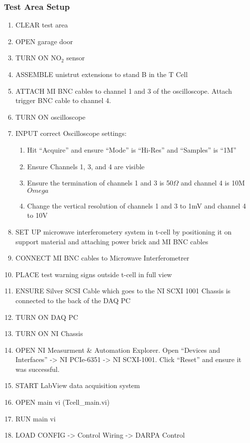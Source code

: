 \subsubsection*{Test Area Setup}
\begin{enumerate}
    \item CLEAR test area
    \item OPEN garage door
    \item TURN ON NO\(_2\) sensor
    \item ASSEMBLE unistrut extensions to stand B in the T Cell
    \item ATTACH MI BNC cables to channel 1 and 3 of the oscilloscope. Attach trigger BNC cable to channel 4.
    \item TURN ON oscilloscope
    \item INPUT correct Oscilloscope settings:
    \begin{enumerate}
    \item Hit ``Acquire'' and ensure ``Mode'' is ``Hi-Res'' and ``Samples'' is ``1M''
    \item Ensure Channels 1, 3, and 4 are visible
    \item Ensure the termination of channels 1 and 3 is 50\(\Omega\) and channel 4 is 10M\(Omega\)
    \item Change the vertical resolution of channels 1 and 3 to 1mV and channel 4 to 10V
    \end{enumerate}
    \item SET UP microwave interferometery system in t-cell by positioning it on support material and attaching power brick and MI BNC cables
    \item CONNECT MI BNC cables to Microwave Interferometrer
    \item PLACE test warning signs outside t-cell in full view
    \item ENSURE Silver SCSI Cable which goes to the NI SCXI 1001 Chassis is connected to the back of the DAQ PC
    \item TURN ON DAQ PC
    \item TURN ON NI Chassis
    \item OPEN NI Measurment \& Automation Explorer. Open ``Devices and Interfaces'' -> NI PCIe-6351 -> NI SCXI-1001. Click ``Reset'' and ensure it was successful.
    \item START LabView data acquisition system
    \item OPEN main vi (Tcell\_main.vi)
    \item RUN main vi
    \item LOAD CONFIG -> Control Wiring -> DARPA Control

\end{enumerate}

